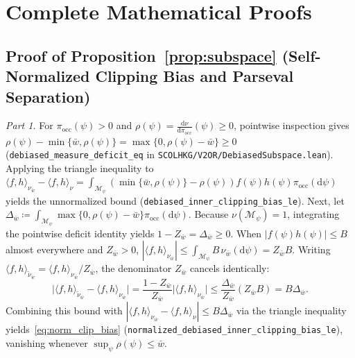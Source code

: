 \ECSwitch
{}

\section{Complete Mathematical Proofs}\label{ec:proofs}

\subsection{Proof of Proposition~\ref*{prop:subspace} (Self-Normalized Clipping Bias and Parseval Separation)}

\emph{Part 1.} For $\pi_{\mathrm{occ}}(\psi) > 0$ and $\rho(\psi) = \frac{\mathrm{d}\nu}{\mathrm{d}\pi_{\mathrm{occ}}}(\psi) \ge 0$, pointwise inspection gives $\rho(\psi) - \min\{\bar{w}, \rho(\psi)\} = \max\{0, \rho(\psi) - \bar{w}\} \ge 0$ (\texttt{debiased\_measure\_deficit\_eq} in \texttt{SCOLHKG/V2OR/DebiasedSubspace.lean}). Applying the triangle inequality to $\langle f, h \rangle_{\nu_{\bar{w}}} - \langle f, h \rangle_\nu = \int_{\mathcal{M}_\psi} (\min\{\bar{w}, \rho(\psi)\} - \rho(\psi)) f(\psi)h(\psi) \pi_{\mathrm{occ}}(\mathrm{d}\psi)$ yields the unnormalized bound (\texttt{debiased\_inner\_clipping\_bias\_le}). Next, let $\Delta_{\bar{w}} \coloneqq \int_{\mathcal{M}_\psi} \max\{0, \rho(\psi) - \bar{w}\}\pi_{\mathrm{occ}}(\mathrm{d}\psi)$. Because $\nu(\mathcal{M}_\psi) = 1$, integrating the pointwise deficit identity yields $1 - Z_{\bar{w}} = \Delta_{\bar{w}} \ge 0$. When $|f(\psi)h(\psi)| \le B$ almost everywhere and $Z_{\bar{w}} > 0$, $|\langle f, h \rangle_{\nu_{\bar{w}}}| \le \int_{\mathcal{M}_\psi} B\,\nu_{\bar{w}}(\mathrm{d}\psi) = Z_{\bar{w}} B$. Writing $\langle f, h \rangle_{\tilde{\nu}_{\bar{w}}} = \langle f, h \rangle_{\nu_{\bar{w}}} / Z_{\bar{w}}$, the denominator $Z_{\bar{w}}$ cancels identically:
\[
  \big|\langle f, h \rangle_{\tilde{\nu}_{\bar{w}}} - \langle f, h \rangle_{\nu_{\bar{w}}}\big|
  = \frac{1 - Z_{\bar{w}}}{Z_{\bar{w}}}\big|\langle f, h \rangle_{\nu_{\bar{w}}}\big|
  \le \frac{\Delta_{\bar{w}}}{Z_{\bar{w}}}(Z_{\bar{w}} B) = B\Delta_{\bar{w}}.
\]
Combining this bound with $|\langle f, h \rangle_{\nu_{\bar{w}}} - \langle f, h \rangle_\nu| \le B\Delta_{\bar{w}}$ via the triangle inequality yields~\eqref{eq:norm_clip_bias} (\texttt{normalized\_debiased\_inner\_clipping\_bias\_le}), vanishing whenever $\sup_\psi \rho(\psi) \le \bar{w}$.

